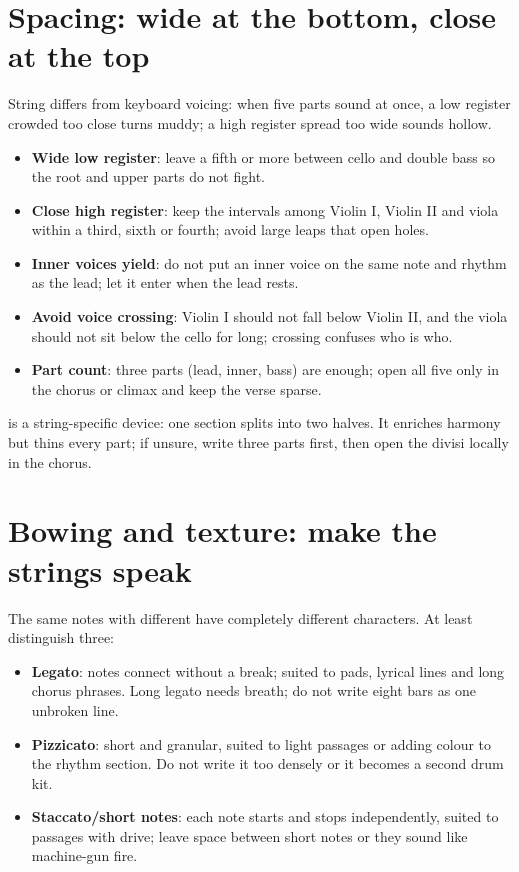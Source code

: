 \section{Spacing: wide at the bottom, close at the top}
\label{sec:string-spacing}

String  differs from keyboard voicing: when five parts sound at once, a low register crowded too close turns muddy; a high register spread too wide sounds hollow.

\begin{itemize}
\item \textbf{Wide low register}: leave a fifth or more between cello and double bass so the root and upper parts do not fight.
\item \textbf{Close high register}: keep the intervals among Violin I, Violin II and viola within a third, sixth or fourth; avoid large leaps that open holes.
\item \textbf{Inner voices yield}: do not put an inner voice on the same note and rhythm as the lead; let it enter when the lead rests.
\item \textbf{Avoid voice crossing}: Violin I should not fall below Violin II, and the viola should not sit below the cello for long; crossing confuses who is who.
\item \textbf{Part count}: three parts (lead, inner, bass) are enough; open all five only in the chorus or climax and keep the verse sparse.
\end{itemize}

 is a string-specific device: one section splits into two halves. It enriches harmony but thins every part; if unsure, write three parts first, then open the divisi locally in the chorus.

\section{Bowing and texture: make the strings speak}
\label{sec:string-bowing}

The same notes with different  have completely different characters. At least distinguish three:

\begin{itemize}
\item \textbf{Legato}: notes connect without a break; suited to pads, lyrical lines and long chorus phrases. Long legato needs breath; do not write eight bars as one unbroken line.
\item \textbf{Pizzicato}: short and granular, suited to light passages or adding colour to the rhythm section. Do not write it too densely or it becomes a second drum kit.
\item \textbf{Staccato/short notes}: each note starts and stops independently, suited to passages with drive; leave space between short notes or they sound like machine-gun fire.
\end{itemize}

